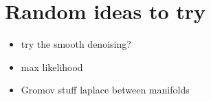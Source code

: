 \section{Random ideas to try}
\label{sec:random-ideas-try}

\begin{itemize}
\item try the smooth denoising?
\item max likelihood
\item Gromov stuff laplace between manifolds 
\end{itemize}
